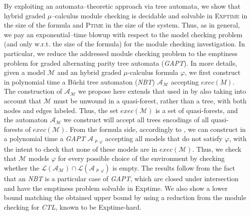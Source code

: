 \documentclass{LMCS}
\theoremstyle{plain}
\def \A             {\mathcal{A}}
\def \CTL           {\emph{CTL}\xspace}
\def \EXP           {{\sc Exptime}\xspace}
\def \EXPTIME       {\textsc{Exptime}\xspace}
\def \GAPT          {\emph{GAPT}\xspace}
\def \L             {\mathcal{L}}
\def \M             {\mathcal{M}}
\def \NBT           {\emph{NBT}\xspace}
\def \PTIME         {\textsc{Ptime}\xspace}
\begin{document}
By exploiting an automata--theoretic approach via tree automata, we show that
hybrid graded $\mu$--calculus module checking is decidable and solvable in
\EXPTIME in the size of the formula and \PTIME in the size of the system. Thus,
as in general, we pay an exponential--time blowup with respect to the model
checking problem (and only w.r.t. the size of the formula) for the module
checking investigation. In particular, we reduce the addressed module checking
problem to the emptiness problem for graded alternating parity tree automata
(\GAPT). In more details, given a model $\M$ and an hybrid graded
$\mu$-calculus formula $\varphi$, we first construct in polynomial time a
B\"uchi tree automaton (\NBT) $\A_{\M}$ accepting $exec(M)$. The construction
of $\A_{\M}$ we propose here extends that used in \cite{KVW01} by also taking
into account that $\M$ must be unwound in a quasi-forest, rather than a tree,
with both nodes and edges labeled. Thus, the set $exec(\M)$ is a set of
quasi-forests, and the automaton $\A_{\M}$ we construct will accept all trees
encodings of all quasi-forests of $exec(\M)$. From the formula side,
accordingly to \cite{BLMV06}, we can construct in a polynomial time a \GAPT
$\A_{\not \models \varphi}$ accepting all models that do not satisfy $\varphi$,
with the intent to check that none of these models are in $exec(\M)$. Thus, we
check that $\M$ models $\varphi$ for every possible choice of the environment
by checking whether the $\L(\A_{\M}) \cap \L(\A_{\not \models \varphi})$ is
empty. The results follow from the fact that an \NBT is a particular case of
\GAPT, which are closed under intersection and have the emptiness problem
solvable in \EXP \cite{BLMV06}. We also show a lower bound matching the
obtained upper bound by using a reduction from the module checking for \CTL,
known to be \EXP-hard.
\end{document}
